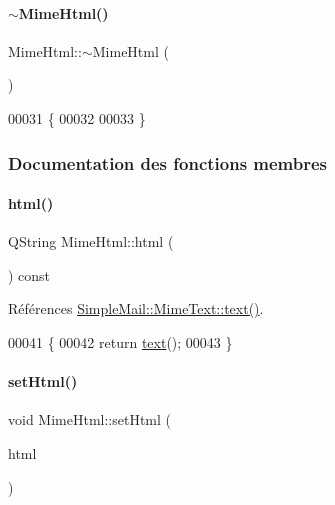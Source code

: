 \paragraph{\texorpdfstring{$\sim$\+Mime\+Html()}{~MimeHtml()}}
{\footnotesize\ttfamily Mime\+Html\+::$\sim$\+Mime\+Html (\begin{DoxyParamCaption}{ }\end{DoxyParamCaption})}


\begin{DoxyCode}
00031 \{
00032 
00033 \}
\end{DoxyCode}


\subsubsection{Documentation des fonctions membres}
\mbox{\label{class_simple_mail_1_1_mime_html_a842b4cadf1faecfbe442cd829aa66cbb}} 
\paragraph{\texorpdfstring{html()}{html()}}
{\footnotesize\ttfamily Q\+String Mime\+Html\+::html (\begin{DoxyParamCaption}{ }\end{DoxyParamCaption}) const}



Références \hyperlink{class_simple_mail_1_1_mime_text_a0e08eb04baae349411b7b94e968147fb}{Simple\+Mail\+::\+Mime\+Text\+::text()}.


\begin{DoxyCode}
00041 \{
00042     \textcolor{keywordflow}{return} \hyperlink{class_simple_mail_1_1_mime_text_a0e08eb04baae349411b7b94e968147fb}{text}();
00043 \}
\end{DoxyCode}
\mbox{\label{class_simple_mail_1_1_mime_html_a77a32b559dcebf04e66816fdd055038c}} 
\paragraph{\texorpdfstring{set\+Html()}{setHtml()}}
{\footnotesize\ttfamily void Mime\+Html\+::set\+Html (\begin{DoxyParamCaption}\item[{const Q\+String \&}]{html }\end{DoxyParamCaption})}



